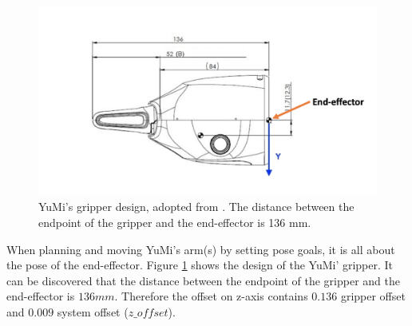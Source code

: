 \begin{figure}[H]
\centering
\includegraphics[width = 0.8\columnwidth]{Implementation/mp/gripperoffset.png}
\caption{YuMi's gripper design, adopted from \citep{Productspecification}. The distance between the endpoint of the gripper and the end-effector is 136 mm.}
\label{gripperoffset}
\end{figure}

When planning and moving YuMi's arm(s) by setting pose goals, it is all about the pose of the end-effector. Figure \ref{gripperoffset} shows the design of the YuMi' gripper. It can be discovered that the distance between the endpoint of the gripper and the end-effector is $136mm$. Therefore the offset on z-axis contains $0.136$ gripper offset and $0.009$ system offset ($z\_offset$).

